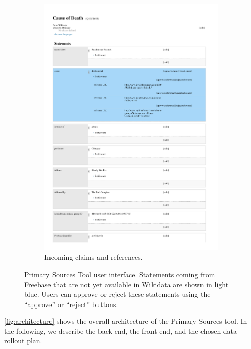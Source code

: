 \documentclass{acm_proc_article-sp}
\begin{document}
\begin{figure}[!t]
\begin{subfigure}[b]{1.0\columnwidth}
        \includegraphics[width=\textwidth]{img/wikidata-cause-of-death.pdf}
        \caption{Incoming claims and references.}
        \label{fig:cause-of-death}
    \end{subfigure}
    \caption{Primary Sources Tool user interface. Statements coming from
       Freebase that are not yet available in Wikidata are shown in light blue.
       Users can approve or reject these statements using the ``approve'' or ``reject'' buttons.}
    \label{fig:primary-sources-tool}
\end{figure}

\autoref{fig:architecture} shows the overall architecture of the Primary Sources tool.
In the following, we describe the back-end, the front-end, and the chosen data rollout plan.
\end{document}

